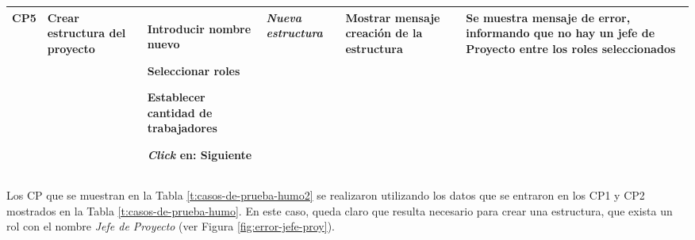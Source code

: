 \begin{table}[H]
{\begin{tabular}{c p{2.3cm} e{4.7cm} p{2cm} p{3cm} p{3cm}}
			CP5 & Crear estructura del proyecto & 
			\item Introducir nombre nuevo
			\item Seleccionar roles
			\item Establecer cantidad de trabajadores
			\item \textit{Click} en: Siguiente
			& \textit{Nueva estructura} & Mostrar mensaje creación de la estructura
			 & Se muestra mensaje de error, informando que no hay un jefe de Proyecto entre los roles seleccionados\\ \bottomrule
		\end{tabular}
	}
\end{table}

Los CP que se muestran en la Tabla \ref{t:casos-de-prueba-humo2} se realizaron utilizando los datos que se entraron en los CP1 y CP2 mostrados en la Tabla \ref{t:casos-de-prueba-humo}. En este caso, queda claro que resulta necesario para crear una estructura, que exista un rol con el nombre \textit{Jefe de Proyecto} (ver Figura \ref{fig:error-jefe-proy}).


